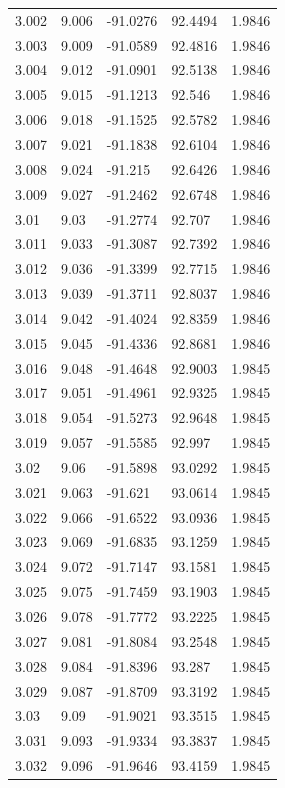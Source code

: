 \begin{tabular}{lllll}
3.002 & 9.006 & -91.0276 & 92.4494 & 1.9846 \\
3.003 & 9.009 & -91.0589 & 92.4816 & 1.9846 \\
3.004 & 9.012 & -91.0901 & 92.5138 & 1.9846 \\
3.005 & 9.015 & -91.1213 & 92.546 & 1.9846 \\
3.006 & 9.018 & -91.1525 & 92.5782 & 1.9846 \\
3.007 & 9.021 & -91.1838 & 92.6104 & 1.9846 \\
3.008 & 9.024 & -91.215 & 92.6426 & 1.9846 \\
3.009 & 9.027 & -91.2462 & 92.6748 & 1.9846 \\
3.01 & 9.03 & -91.2774 & 92.707 & 1.9846 \\
3.011 & 9.033 & -91.3087 & 92.7392 & 1.9846 \\
3.012 & 9.036 & -91.3399 & 92.7715 & 1.9846 \\
3.013 & 9.039 & -91.3711 & 92.8037 & 1.9846 \\
3.014 & 9.042 & -91.4024 & 92.8359 & 1.9846 \\
3.015 & 9.045 & -91.4336 & 92.8681 & 1.9846 \\
3.016 & 9.048 & -91.4648 & 92.9003 & 1.9845 \\
3.017 & 9.051 & -91.4961 & 92.9325 & 1.9845 \\
3.018 & 9.054 & -91.5273 & 92.9648 & 1.9845 \\
3.019 & 9.057 & -91.5585 & 92.997 & 1.9845 \\
3.02 & 9.06 & -91.5898 & 93.0292 & 1.9845 \\
3.021 & 9.063 & -91.621 & 93.0614 & 1.9845 \\
3.022 & 9.066 & -91.6522 & 93.0936 & 1.9845 \\
3.023 & 9.069 & -91.6835 & 93.1259 & 1.9845 \\
3.024 & 9.072 & -91.7147 & 93.1581 & 1.9845 \\
3.025 & 9.075 & -91.7459 & 93.1903 & 1.9845 \\
3.026 & 9.078 & -91.7772 & 93.2225 & 1.9845 \\
3.027 & 9.081 & -91.8084 & 93.2548 & 1.9845 \\
3.028 & 9.084 & -91.8396 & 93.287 & 1.9845 \\
3.029 & 9.087 & -91.8709 & 93.3192 & 1.9845 \\
3.03 & 9.09 & -91.9021 & 93.3515 & 1.9845 \\
3.031 & 9.093 & -91.9334 & 93.3837 & 1.9845 \\
3.032 & 9.096 & -91.9646 & 93.4159 & 1.9845 \\

\end{tabular}
